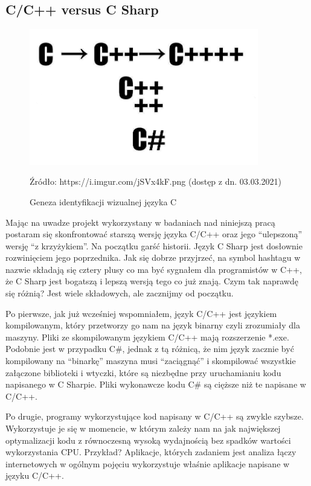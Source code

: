 \documentclass{article}
\begin{document}
	\subsection{C/C++ versus C Sharp}
	\begin{figure}
		\centering
		\includegraphics[width=10cm]{cvscsharp}
		\caption{Geneza identyfikacji wizualnej języka C}
		Źródło: https://i.imgur.com/jSVx4kF.png (dostęp z dn. 03.03.2021)
	\end{figure}
	\par
	Mając na uwadze projekt wykorzystany w badaniach nad niniejszą pracą postaram się skonfrontować starszą wersję języka C/C++ oraz jego “ulepszoną” wersję “z krzyżykiem”. Na początku garść historii. Język C Sharp jest dosłownie rozwinięciem jego poprzednika. Jak się dobrze przyjrzeć, na symbol hashtagu w nazwie składają się cztery plusy co ma być sygnałem dla programistów w C++, że C Sharp jest bogatszą i lepszą wersją tego co już znają. Czym tak naprawdę się różnią? Jest wiele składowych, ale zacznijmy od początku.
	\par
	Po pierwsze, jak już wcześniej wspomniałem, język C/C++ jest językiem kompilowanym, który przetworzy go nam na język binarny czyli zrozumiały dla maszyny. Pliki ze skompilowanym językiem C/C++ mają rozszerzenie *.exe. Podobnie jest w przypadku C#, jednak z tą różnicą, że nim język zacznie być kompilowany na “binarkę” maszyna musi “zaciągnąć” i skompilować wszystkie załączone biblioteki i wtyczki, które są niezbędne przy uruchamianiu kodu napisanego w C Sharpie. Pliki wykonawcze kodu C# są cięższe niż te napisane w C/C++.
	\par
	Po drugie, programy wykorzystujące kod napisany w C/C++ są zwykle szybsze. Wykorzystuje je się w momencie, w którym zależy nam na jak największej optymalizacji kodu z równoczesną wysoką wydajnością bez spadków wartości wykorzystania CPU. Przykład? Aplikacje, których zadaniem jest analiza łączy internetowych w ogólnym pojęciu wykorzystuje właśnie aplikacje napisane w języku C/C++.
\end{document}
